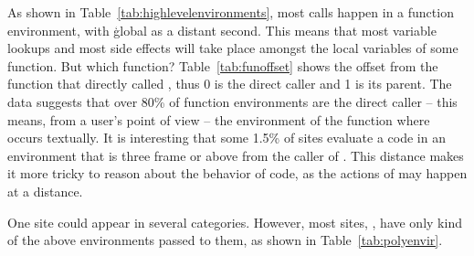 \documentclass[screen,acmsmall]{acmart}
\begin{document}
As shown in Table~\ref{tab:highlevelenvironments}, most calls happen in a
function environment, with \c{global} as a distant second. This means that most
variable lookups and most side effects will take place amongst the local
variables of some function. But which function? Table~\ref{tab:funoffset} shows the offset from
the function that directly called \eval, thus 0 is the direct caller and 1 is
its parent. The data suggests that over 80\% of function environments are the
direct caller -- this means, from a user's point of view -- the environment of
the function where \eval occurs textually. It is interesting that some 1.5\% of
sites evaluate a code in an environment that is three frame or above from the
caller of \eval. This distance makes it more tricky to reason about the behavior
of code, as the actions of \eval may happen at a distance.

One site could appear in several categories. However, most sites, \ie \packageNbOneCategoryEnvirSitePercent, have only kind of the above environments passed to them, as shown in Table~\ref{tab:polyenvir}.
\end{document}
